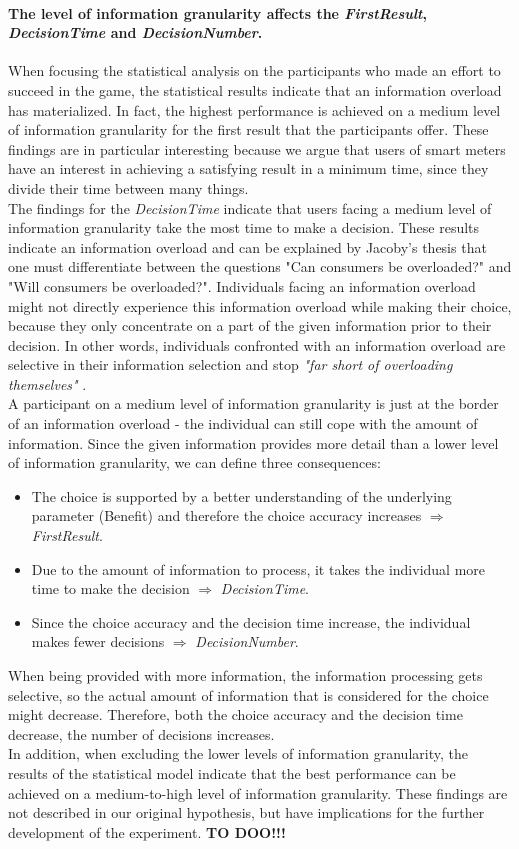 \paragraph{The level of information granularity affects the \textit{FirstResult}, \textit{DecisionTime} and \textit{DecisionNumber}.}
When focusing the statistical analysis on the participants who made an effort to succeed in the game, the statistical results indicate that an information overload has materialized. In fact, the highest performance is achieved on a medium level of information granularity for the first result that the participants offer. These findings are in particular interesting because we argue that users of smart meters have an interest in achieving a satisfying result in a minimum time, since they divide their time between many things.\\
The findings for the \textit{DecisionTime} indicate that users facing a medium level of information granularity take the most time to make a decision. These results indicate an information overload and can be explained by Jacoby's thesis that one must differentiate between the questions "Can consumers be overloaded?" and "Will consumers be overloaded?". 
Individuals facing an information overload might not directly experience this information overload while making their choice, because they only concentrate on a part of the given information prior to their decision. In other words, individuals confronted with an information overload are selective in their information selection and stop \textit{"far short of overloading themselves"} \citep{Jacoby1984}.\\
A participant on a medium level of information granularity is just at the border of an information overload - the individual can still cope with the amount of information. Since the given information provides more detail than a lower level of information granularity, we can define three consequences:
\begin{itemize}
\item The choice is supported by a better understanding of the underlying parameter (Benefit) and therefore the choice accuracy increases $\Rightarrow$ \textit{FirstResult}.
\item Due to the amount of information to process, it takes the individual more time to make the decision $\Rightarrow$ \textit{DecisionTime}.
\item Since the choice accuracy and the decision time increase, the individual makes fewer decisions $\Rightarrow$ \textit{DecisionNumber}.
\end{itemize}
When being provided with more information, the information processing gets selective, so the actual amount of information that is considered for the choice might decrease. Therefore, both the choice accuracy and the decision time decrease, the number of decisions increases.\\
In addition, when excluding the lower levels of information granularity, the results of the statistical model indicate that the best performance can be achieved on a medium-to-high level of information granularity. These findings are not described in our original hypothesis, but have implications for the further development of the experiment. 
\textbf{TO DOO!!!}

